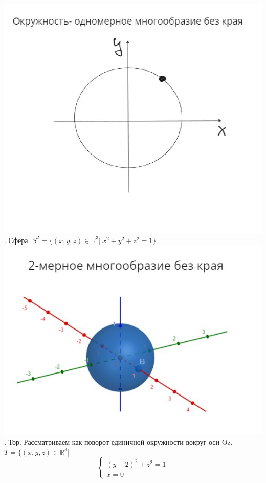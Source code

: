 \documentclass[12pt,a4paper]{article}
\begin{document}
\newline \includegraphics[scale=0.85]{images/Section 2. Manifold/image2}
. Сфера: \(S^2 = \{(x,y,z)\in\mathbb{R}^3|~ x^2+y^2+z^2=1\}\)
\newline \includegraphics[scale=0.5]{images/Section 2. Manifold/image3}
. Тор. Рассматриваем как поворот единичной окружности вокруг оси Oz.
\(T=\{(x,y,z)\in \mathbb{R}^3\)|
\begin{equation*}
\begin{cases}
(y - 2)^2 + z^2=1
\\
x =0
\end{cases}
\end{equation*}
\end{document}
